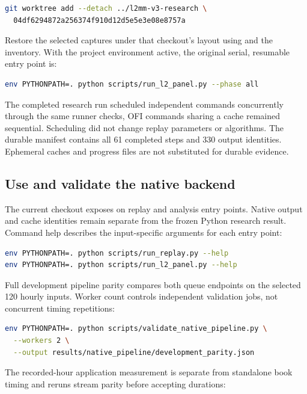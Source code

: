 \begin{lstlisting}[language=bash]
git worktree add --detach ../l2mm-v3-research \
  04df6294872a256374f910d12d5e5e3e08e8757a
\end{lstlisting}

Restore the selected captures under that checkout's  layout
using \code{DATA.md} and the inventory. With the project environment active,
the original serial, resumable entry point is:

\begin{lstlisting}[language=bash]
env PYTHONPATH=. python scripts/run_l2_panel.py --phase all
\end{lstlisting}

The completed research run scheduled independent commands concurrently through
the same runner checks, OFI commands sharing a cache remained sequential.
Scheduling did not change replay parameters or algorithms. The durable
manifest contains all 61 completed steps and 330 output identities. Ephemeral
caches and progress files are not substituted for durable evidence.

\subsection{Use and validate the native backend}

The current checkout exposes  on replay and analysis
entry points. Native output and cache identities remain separate from the
frozen Python research result. Command help describes the input-specific
arguments for each entry point:

\begin{lstlisting}[language=bash]
env PYTHONPATH=. python scripts/run_replay.py --help
env PYTHONPATH=. python scripts/run_l2_panel.py --help
\end{lstlisting}

Full development pipeline parity compares both queue endpoints on the selected
120 hourly inputs. Worker count controls independent validation jobs, not
concurrent timing repetitions:

\begin{lstlisting}[language=bash]
env PYTHONPATH=. python scripts/validate_native_pipeline.py \
  --workers 2 \
  --output results/native_pipeline/development_parity.json
\end{lstlisting}

The recorded-hour application measurement is separate from standalone book
timing and reruns stream parity before accepting durations:

